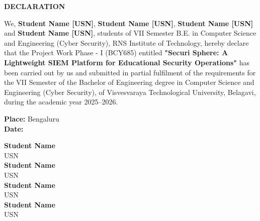 \begin{center}
    \Large{\textbf{DECLARATION}} \\[1.5cm]
\end{center}

\begin{justify}
    

We, \textbf{Student Name [USN]}, \textbf{Student Name [USN]}, 
\textbf{Student Name [USN]} and \textbf{Student Name [USN]}, students of 
VII Semester B.E. in Computer Science and Engineering (Cyber Security), 
RNS Institute of Technology, hereby declare that the Project Work Phase - I (BCY685) 
entitled \textbf{"Securi Sphere: A Lightweight SIEM Platform for Educational Security Operations"} has been carried out by us and submitted 
in partial fulfilment of the requirements for the VII Semester of the 
Bachelor of Engineering degree in Computer Science and Engineering (Cyber Security), 
of Visvesvaraya Technological University, Belagavi, during the academic 
year 2025–2026.
\end{justify}
\vspace{2cm}
\begin{flushleft}
    

\textbf{Place:} Bengaluru \\[0.5cm]
\textbf{Date:} \underline{\hspace{3cm}}
\end{flushleft}
\vspace{2cm}

\begin{flushright}
\textbf{Student Name} \\ 
USN \\[1cm]

\textbf{Student Name} \\ 
USN \\[1cm]

\textbf{Student Name} \\ 
USN \\[1cm]

\textbf{Student Name} \\ 
USN \\[1cm]

\end{flushright}